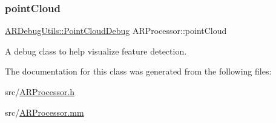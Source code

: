 \subsubsection{\texorpdfstring{point\+Cloud}{pointCloud}}
{\footnotesize\ttfamily \mbox{\hyperlink{class_a_r_debug_utils_1_1_point_cloud_debug}{A\+R\+Debug\+Utils\+::\+Point\+Cloud\+Debug}} A\+R\+Processor\+::point\+Cloud}



A debug class to help visualize feature detection. 



The documentation for this class was generated from the following files\+:\begin{DoxyCompactItemize}
\item 
src/\mbox{\hyperlink{_a_r_processor_8h}{A\+R\+Processor.\+h}}\item 
src/\mbox{\hyperlink{_a_r_processor_8mm}{A\+R\+Processor.\+mm}}\end{DoxyCompactItemize}
